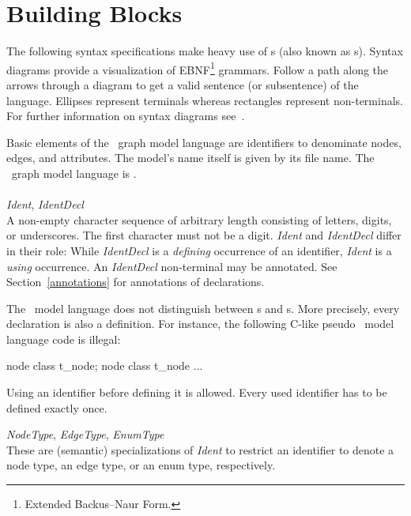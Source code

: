 \section{Building Blocks}
\label{modelbb}

\begin{note}
The following syntax specifications make heavy use of s (also known as s). Syntax diagrams provide a visualization of EBNF\footnote{Extended Backus–Naur Form.} grammars. Follow a path along the arrows through a diagram to get a valid sentence (or subsentence) of the language. Ellipses represent terminals whereas rectangles represent non-terminals. For further information on syntax diagrams see~\cite{MMJW:91}.
\end{note}
Basic elements of the \GrG\ graph model language are identifiers to denominate nodes, edges, and attributes. The model's name itself is given by its file name. The \GrG\ graph model language is .\\
\\
\emph{Ident}, \emph{IdentDecl}\\ \nopagebreak
A non-empty character sequence of arbitrary length consisting of letters, digits, or underscores. The first character must not be a digit. \emph{Ident} and \emph{IdentDecl} differ in their role: While \emph{IdentDecl} is a \emph{defining} occurrence of an identifier, \emph{Ident} is a \emph{using} occurrence. An \emph{IdentDecl} non-terminal may be annotated. See Section~\ref{annotations} for annotations of declarations.
\begin{note}
\label{note:modeldecl}
  The \GrG\ model language does not distinguish between s and s. More precisely, every declaration is also a definition. For instance, the following C-like pseudo \GrG\ model language code is illegal:
\begin{grgen}
node class t_node;
node class t_node {
  ...
}
\end{grgen}
Using an identifier before defining it is allowed. Every used identifier has to be defined exactly once.
\end{note}
\pagebreak
\emph{NodeType}, \emph{EdgeType}, \emph{EnumType}\\ \nopagebreak
These are (semantic) specializations of \emph{Ident} to restrict an identifier to denote a node type, an edge type, or an enum type, respectively.

